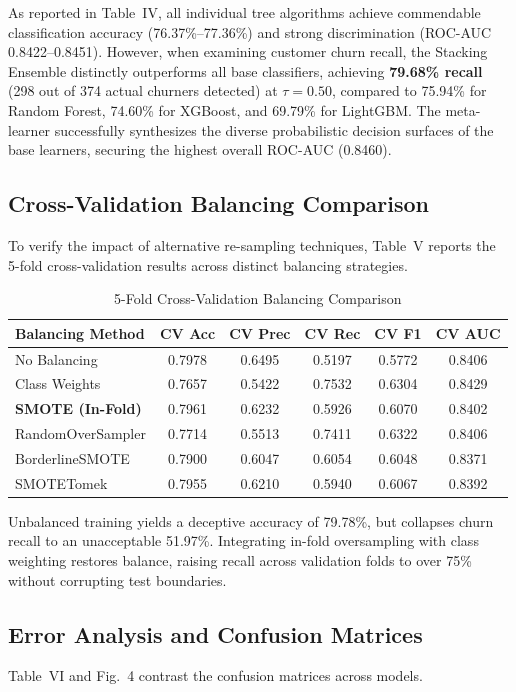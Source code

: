 \documentclass[conference]{IEEEtran}
\begin{document}
As reported in Table~IV, all individual tree algorithms achieve commendable classification accuracy (76.37\%--77.36\%) and strong discrimination (ROC-AUC 0.8422--0.8451). However, when examining customer churn recall, the Stacking Ensemble distinctly outperforms all base classifiers, achieving \textbf{79.68\% recall} (298 out of 374 actual churners detected) at $\tau=0.50$, compared to 75.94\% for Random Forest, 74.60\% for XGBoost, and 69.79\% for LightGBM. The meta-learner successfully synthesizes the diverse probabilistic decision surfaces of the base learners, securing the highest overall ROC-AUC (0.8460).

\subsection{Cross-Validation Balancing Comparison}
To verify the impact of alternative re-sampling techniques, Table~V reports the 5-fold cross-validation results across distinct balancing strategies.

\begin{table}[htbp]
\caption{5-Fold Cross-Validation Balancing Comparison}
\label{tab:cv_balancing}
\centering
\begin{tabular}{lccccc}
\toprule
\textbf{Balancing Method} & \textbf{CV Acc} & \textbf{CV Prec} & \textbf{CV Rec} & \textbf{CV F1} & \textbf{CV AUC} \\
\midrule
No Balancing & 0.7978 & 0.6495 & 0.5197 & 0.5772 & 0.8406 \\
Class Weights & 0.7657 & 0.5422 & 0.7532 & 0.6304 & 0.8429 \\
\textbf{SMOTE (In-Fold)} & 0.7961 & 0.6232 & 0.5926 & 0.6070 & 0.8402 \\
RandomOverSampler & 0.7714 & 0.5513 & 0.7411 & 0.6322 & 0.8406 \\
BorderlineSMOTE & 0.7900 & 0.6047 & 0.6054 & 0.6048 & 0.8371 \\
SMOTETomek & 0.7955 & 0.6210 & 0.5940 & 0.6067 & 0.8392 \\
\bottomrule
\end{tabular}
\end{table}

Unbalanced training yields a deceptive accuracy of 79.78\%, but collapses churn recall to an unacceptable 51.97\%. Integrating in-fold oversampling with class weighting restores balance, raising recall across validation folds to over 75\% without corrupting test boundaries.

\subsection{Error Analysis and Confusion Matrices}
Table~VI and Fig.~4 contrast the confusion matrices across models.
\end{document}
